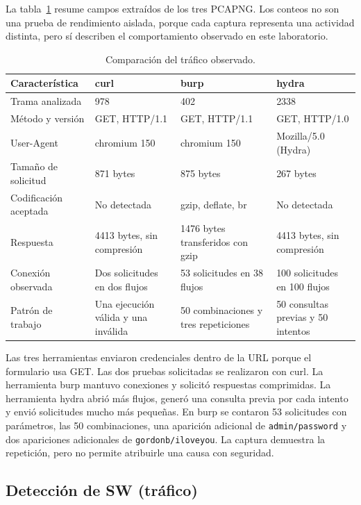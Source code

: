 \documentclass[letterpaper,12pt]{article}
\begin{document}
La tabla~\ref{tab:trafico} resume campos extraídos de los tres PCAPNG. Los conteos no son
una prueba de rendimiento aislada, porque cada captura representa una actividad distinta,
pero sí describen el comportamiento observado en este laboratorio.

\begin{table}[htbp]
\centering
\label{tab:trafico}
\small
\begin{tabularx}{\textwidth}{|>{\raggedright\arraybackslash}p{3.1cm}|X|X|X|}
\hline
\textbf{Característica} & \textbf{curl} & \textbf{burp} & \textbf{hydra} \\
\hline
Trama analizada & 978 & 402 & 2338 \\
\hline
Método y versión & GET, HTTP/1.1 & GET, HTTP/1.1 & GET, HTTP/1.0 \\
\hline
User-Agent & chromium 150 & chromium 150 & Mozilla/5.0 (Hydra) \\
\hline
Tamaño de solicitud & 871 bytes & 875 bytes & 267 bytes \\
\hline
Codificación aceptada & No detectada & gzip, deflate, br & No detectada \\
\hline
Respuesta & 4413 bytes, sin compresión & 1476 bytes transferidos con gzip & 4413 bytes, sin compresión \\
\hline
Conexión observada & Dos solicitudes en dos flujos & 53 solicitudes en 38 flujos & 100 solicitudes en 100 flujos \\
\hline
Patrón de trabajo & Una ejecución válida y una inválida & 50 combinaciones y tres repeticiones & 50 consultas previas y 50 intentos \\
\hline
\end{tabularx}
\caption{Comparación del tráfico observado.}
\end{table}

Las tres herramientas enviaron credenciales dentro de la URL porque el formulario usa
GET. Las dos pruebas solicitadas se realizaron con curl. La herramienta burp mantuvo conexiones y solicitó
respuestas comprimidas. La herramienta hydra abrió más flujos, generó una consulta previa por cada intento
y envió solicitudes mucho más pequeñas. En burp se contaron 53 solicitudes con parámetros,
las 50 combinaciones, una aparición adicional de \texttt{admin/password} y dos apariciones
adicionales de \texttt{gordonb/iloveyou}. La captura demuestra la repetición, pero no permite
atribuirle una causa con seguridad.

\subsection{Detección de SW (tráfico)}
\end{document}

